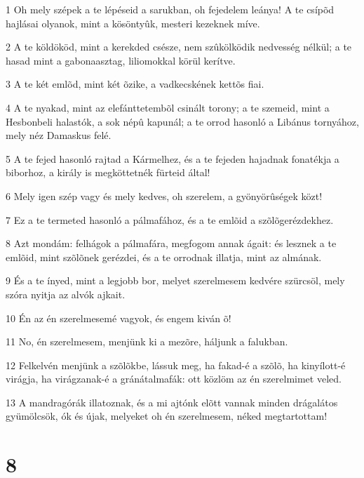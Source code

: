 \par 1 Oh mely szépek a te lépéseid a sarukban, oh fejedelem leánya! A te csípõd hajlásai olyanok, mint a kösöntyûk, mesteri kezeknek míve.
\par 2 A te köldököd, mint a kerekded csésze, nem szûkölködik nedvesség nélkül; a te hasad mint a gabonaasztag, liliomokkal körül kerítve.
\par 3 A te két emlõd, mint két õzike, a vadkecskének kettõs fiai.
\par 4 A te nyakad, mint az elefánttetembõl csinált torony; a te szemeid, mint a Hesbonbeli halastók, a sok népû kapunál; a te orrod hasonló a Libánus tornyához, mely néz Damaskus felé.
\par 5 A te fejed hasonló rajtad a Kármelhez, és a te fejeden hajadnak fonatékja a biborhoz, a király is megköttetnék fürteid által!
\par 6 Mely igen szép vagy és mely kedves, oh szerelem, a gyönyörûségek közt!
\par 7 Ez a te termeted hasonló a pálmafához, és a te emlõid a szõlõgerézdekhez.
\par 8 Azt mondám: felhágok a pálmafára, megfogom annak ágait: és lesznek a te emlõid, mint szõlõnek gerézdei, és a te orrodnak illatja, mint az almának.
\par 9 És a te ínyed, mint a legjobb bor, melyet szerelmesem kedvére szürcsöl, mely szóra nyitja az alvók ajkait.
\par 10 Én az én szerelmesemé vagyok, és engem kiván õ!
\par 11 No, én szerelmesem, menjünk ki a mezõre, háljunk a falukban.
\par 12 Felkelvén menjünk a szõlõkbe, lássuk meg, ha fakad-é a szõlõ, ha kinyílott-é virágja, ha virágzanak-é a gránátalmafák: ott közlöm az én szerelmimet veled.
\par 13 A mandragórák illatoznak, és a mi ajtónk elõtt vannak minden drágalátos gyümölcsök, ók és újak, melyeket oh én szerelmesem, néked megtartottam!

\chapter{8}

